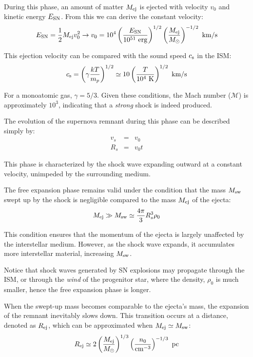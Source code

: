 During this phase, an amount of matter \( M_{\rm ej} \) is ejected with velocity \( v_0 \) and kinetic energy \( E_{\rm SN} \). From this we can derive the constant velocity:
%
\[
E_{\rm SN} = \frac{1}{2} M_{\rm ej} v_0^2 \rightarrow v_0 = 10^4 \left( \frac{E_{\rm SN}}{10^{51}~\text{erg}} \right)^{1/2} \left( \frac{M_{\rm ej}}{M_\odot} \right)^{-1/2}~\text{km/s}
\]

This ejection velocity can be compared with the sound speed \( c_{\rm s} \) in the ISM:
%
\[
c_{\rm s} = \left( \gamma \frac{k T}{m_p} \right)^{1/2} \simeq 10 \left( \frac{T}{10^4~\text{K}} \right)^{1/2}~\text{km/s}
\]

For a monoatomic gas, \( \gamma = 5/3 \). Given these conditions, the Mach number (\( \mathcal M \)) is approximately \( 10^3 \), indicating that a \emph{strong} shock is indeed produced.

The evolution of the supernova remnant during this phase can be described simply by:
%
\begin{eqnarray*}
v_s & =  & v_0 \\
R_s & = & v_0 t 
\end{eqnarray*}

This phase is characterized by the shock wave expanding outward at a constant velocity, unimpeded by the surrounding medium.
 
The free expansion phase remains valid under the condition that the mass \( M_{\rm sw} \) swept up by the shock is negligible compared to the mass \( M_{\rm ej} \) of the ejecta:
%
\[
M_{\rm ej} \gg M_{\rm sw} \simeq \frac{4\pi}{3} R_s^3 \rho_0
\]

This condition ensures that the momentum of the ejecta is largely unaffected by the interstellar medium. However, as the shock wave expands, it accumulates more interstellar material, increasing \( M_{\rm sw} \).

Notice that shock waves generated by SN explosions may propagate through the ISM, or through the \emph{wind} of the progenitor star, where the density, \( \rho_0 \) is much smaller, hence the free expansion phase is longer.

When the swept-up mass becomes comparable to the ejecta's mass, the expansion of the remnant inevitably slows down. 
%
This transition occurs at a distance, denoted as \( R_{\rm ej} \), which can be approximated when \( M_{\rm ej} \simeq M_{\rm sw} \):
%
\[
R_{\rm ej} \simeq 2 \left( \frac{M_{\rm ej}}{M_\odot} \right)^{1/3} \left( \frac{n_0}{\text{cm}^{-3}} \right)^{-1/3}~\text{pc}
\]

